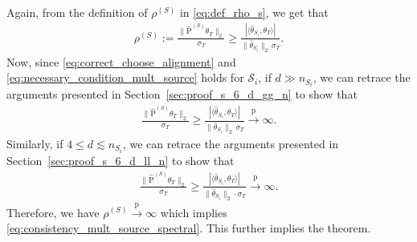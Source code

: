 \documentclass[10pt]{article}
\newcommand{\convp}{\xrightarrow{\mathrm{p}}}
\newcommand{\wh}{\widehat}
\newcommand{\trg}{T}
\newcommand{\thetaT}{\theta_{\trg}}
\newcommand{\sigmaT}{\sigma_{\trg}}
\newcommand{\calS}{\mathcal S}
\newcommand{\src}{S}
\newcommand{\nSm}[1]{n_{\src_{#1}}}
\begin{document}
Again, from the definition of $\rho^{(\src)}$ in \eqref{eq:def_rho_s}, we get that 
\begin{align}
    \rho^{(\src)}:=\frac{\|\wh{\mathrm P}^{(\src)}\thetaT\|_2}{\sigmaT} \ge \frac{|\langle \wh \theta_{\src_i},\thetaT\rangle|}{\|\wh \theta_{\src_i}\|_2\,\sigmaT}.
\end{align}
Now, since \eqref{eq:correct_choose_alignment} and \eqref{eq:necessary_condition_mult_source} holds for $\calS_i$, if $d \gg \nSm{i}$, we can retrace the arguments presented in Section~\ref{sec:proof_s_6_d_gg_n} to show that
\begin{align}
    \frac{\|\wh{\mathrm P}^{(\src)}\thetaT\|_2}{\sigmaT} \ge \frac{|\langle \wh \theta_{\src_i},\thetaT\rangle|}{\|\wh \theta_{\src_i}\|_2\,\sigmaT} \convp \infty.
\end{align}
Similarly, if $4 \le d \lesssim \nSm{i}$, we can retrace the arguments presented in Section~\ref{sec:proof_s_6_d_ll_n} to show that
\begin{align}
    \frac{\|\wh{\mathrm P}^{(\src)}\thetaT\|_2}{\sigmaT} \ge \frac{|\langle \wh \theta_{\src_i},\thetaT\rangle|}{\|\wh \theta_{\src_i}\|_2\cdot\sigmaT} \convp \infty.
\end{align}
Therefore, we have $\rho^{(\src)} \convp \infty$ which implies \eqref{eq:consistency_mult_source_spectral}. This further implies the theorem.
\end{document}
